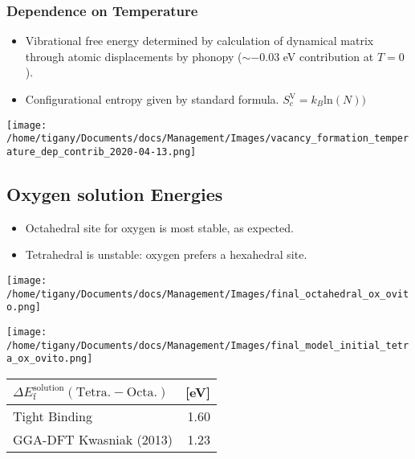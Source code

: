 \documentclass[11pt]{article}
\begin{document}
\subsubsection*{Dependence on Temperature}
\label{sec:org3347398}
\begin{itemize}
\item Vibrational free energy determined by calculation of dynamical
matrix through atomic displacements by phonopy (\(\sim-0.03\) eV
contribution at \(T=0\)).
\item Configurational entropy given by standard formula. \(S_c^{\text{V}} = k_B
      \text{ln}( N))\)
\end{itemize}

\begin{center}
\texttt{[image: /home/tigany/Documents/docs/Management/Images/vacancy\_formation\_temperature\_dep\_contrib\_2020-04-13.png]}
\end{center}


\subsection*{Oxygen solution Energies}
\label{sec:orgc33659f}
\begin{itemize}
\item Octahedral site for oxygen is most stable, as expected.
\item Tetrahedral is unstable: oxygen prefers a hexahedral site.
\end{itemize}

\begin{center}
\texttt{[image: /home/tigany/Documents/docs/Management/Images/final\_octahedral\_ox\_ovito.png]}
\end{center}

\begin{center}
\texttt{[image: /home/tigany/Documents/docs/Management/Images/final\_model\_initial\_tetra\_ox\_ovito.png]}
\end{center}

\begin{center}
\begin{tabular}{lr}
\(\Delta E_{\text{f}}^{\text{solution}}(\text{Tetra.} - \text{Octa.} )\) & [eV]\\
\hline
Tight Binding & 1.60\\
GGA-DFT Kwasniak (2013) & 1.23\\
\hline
\end{tabular}
\end{center}
\end{document}

